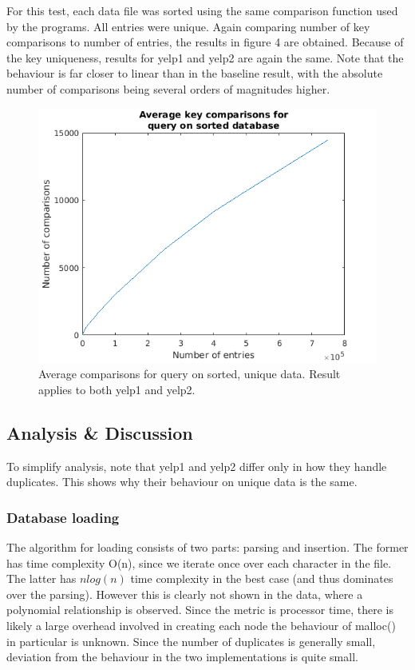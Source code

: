 \documentclass[australian,english]{article}
\begin{document}
For this test, each data file was sorted using the same comparison
function used by the programs. All entries were unique. Again comparing
number of key comparisons to number of entries, the results in figure
4 are obtained. Because of the key uniqueness, results for yelp1 and
yelp2 are again the same. Note that the behaviour is far closer to
linear than in the baseline result, with the absolute number of comparisons
being several orders of magnitudes higher.
\begin{figure}[H]
\includegraphics[scale=0.8]{figs/ordered}

\caption{Average comparisons for query on sorted, unique data. Result applies
to both yelp1 and yelp2.}

\end{figure}


\subsection*{Analysis \& Discussion}

To simplify analysis, note that yelp1 and yelp2 differ only in how
they handle duplicates. This shows why their behaviour on unique data
is the same.

\subsubsection*{Database loading}

The algorithm for loading consists of two parts: parsing and insertion.
The former has time complexity O(n), since we iterate once over each
character in the file. The latter has $nlog(n)$ time complexity in
the best case (and thus dominates over the parsing). However this
is clearly not shown in the data, where a polynomial relationship
is observed. Since the metric is processor time, there is likely a
large overhead involved in creating each node \textemdash{} the behaviour
of malloc() in particular is unknown. Since the number of duplicates
is generally small, deviation from the behaviour in the two implementations
is quite small.
\end{document}
